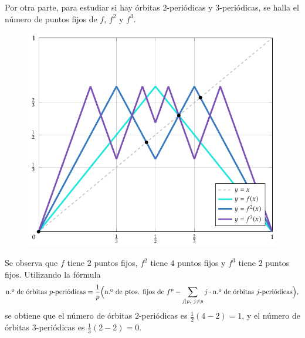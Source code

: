 \documentclass[11pt]{report}
\begin{document}
\begin{solution}
    Por otra parte, para estudiar si hay órbitas $2$-periódicas y $3$-periódicas, se halla el número de puntos fijos de $f$, $f^2$ y $f^3$.
    \begin{figure}[H]
        \centering
        \includegraphics{./plot2/main.pdf}
    \end{figure}
    Se observa que $f$ tiene $2$ puntos fijos, $f^2$ tiene $4$ puntos fijos y $f^3$ tiene $2$ puntos fijos. Utilizando la fórmula
    \[\textup{n.º de órbitas } p \textup{-periódicas} = \frac{1}{p}\Bigl(\textup{n.º de ptos. fijos de } f^p - \sum_{j \mid p, \ j \neq p} j \cdot \textup{n.º de órbitas } j \textup{-periódicas}\Bigr),\]
    se obtiene que el número de órbitas $2$-periódicas es $\frac{1}{2}(4-2) = 1$, y el número de órbitas $3$-periódicas es $\frac{1}{3}(2-2) = 0$.


\end{solution}
\end{document}
